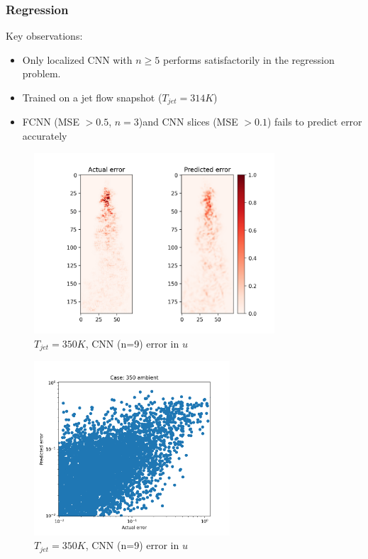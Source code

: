 \documentclass{article}
\begin{document}
		
\subsubsection{Regression}
 Key observations:
	\begin{itemize}
          \item Only localized CNN with $n\ge 5$ performs satisfactorily in the regression problem.
       	  \item Trained on a jet flow snapshot  ($T_{jet}=314 K$)
       	  \item FCNN (MSE $> 0.5$, $n=3$)and CNN slices (MSE $> 0.1$) fails to predict error accurately 
    \end{itemize}

\begin{figure}
    \centering
    \includegraphics[width=0.8\textwidth]{figures/error_prediction_350.png}
    \caption{$T_{jet} = 350K$, CNN (n=9) error in $u$}
\end{figure}
\begin{figure}
	\centering
	\includegraphics[width=0.65\textwidth]{figures/error_scatter_350.png}
	\caption{$T_{jet} = 350 K$, CNN (n=9) error in $u$}
\end{figure}
\end{document}
